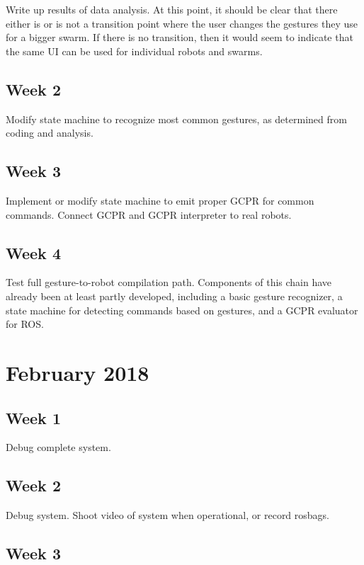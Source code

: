 Write up results of data analysis.
At this point, it should be clear that there either is or is not a transition point where the user changes the gestures they use for a bigger swarm. 
If there is no transition, then it would seem to indicate that the same UI can be used for individual robots and swarms. 

\subsection{Week 2}

Modify state machine to recognize most common gestures, as determined from coding and analysis. 

\subsection{Week 3}

Implement or modify state machine to emit proper GCPR for common commands. 
Connect GCPR and GCPR interpreter to real robots.
 
\subsection{Week 4}

Test full gesture-to-robot compilation path. Components of this chain have already been at least partly developed, including a basic gesture recognizer, a state machine for detecting commands based on gestures, and a GCPR evaluator for ROS.

\section{February 2018}

\subsection{Week 1}

Debug complete system. 

\subsection{Week 2}

Debug system. 
Shoot video of system when operational, or record rosbags. 

\subsection{Week 3}

